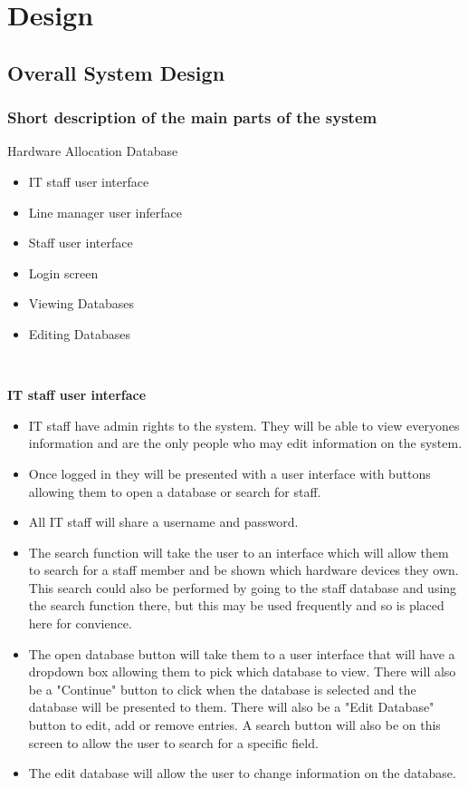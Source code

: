 \chapter{Design}

\section{Overall System Design}

\subsection{Short description of the main parts of the system}

Hardware Allocation Database

\begin{itemize}
\item IT staff user interface
\item Line manager user inferface
\item Staff user interface
\item Login screen
\item Viewing Databases
\item Editing Databases
\end{itemize}

\

\textbf{IT staff user interface}

\begin{itemize}
\item IT staff have admin rights to the system. They will be able to view everyones information and are the only people who may edit information on the system.
\item Once logged in they will be presented with a user interface with buttons allowing them to open a database or search for staff.
\item All IT staff will share a username and password.
\item The search function will take the user to an interface which will allow them to search for a staff member and be shown which hardware devices they own. This search could also be performed by going to the staff database and using the search function there, but this may be used frequently and so is placed here for convience.
\item The open database button will take them to a user interface that will have a dropdown box allowing them to pick which database to view. There will also be a "Continue" button to click when the database is selected and the database will be presented to them. There will also be a "Edit Database" button to edit, add or remove entries. A search button will also be on this screen to allow the user to search for a specific field.
\item The edit database will allow the user to change information on the database.
\end{itemize}

